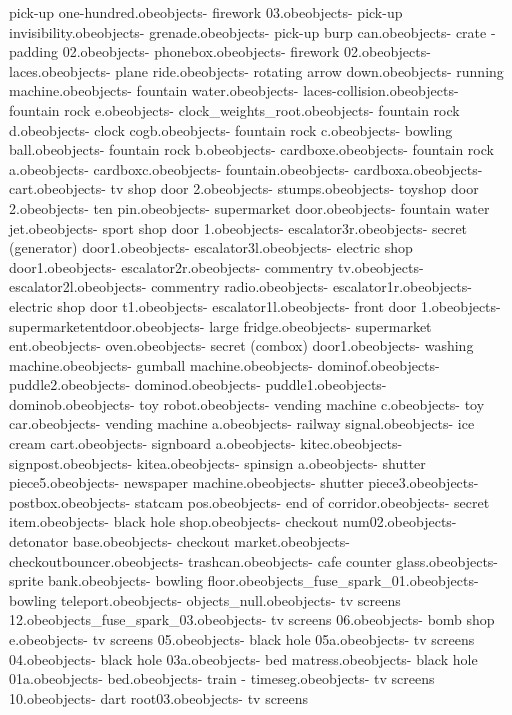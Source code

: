 pick-up one-hundred.obe objects\bank - firework 03.obe objects\bank - pick-up invisibility.obe objects\bank - grenade.obe objects\bank - pick-up burp can.obe objects\bank - crate - padding 02.obe objects\bank - phonebox.obe objects\bank - firework 02.obe objects\bank - laces.obe objects\bank - plane ride.obe objects\bank - rotating arrow down.obe objects\bank - running machine.obe objects\bank - fountain water.obe objects\bank - laces-collision.obe objects\bank - fountain rock e.obe objects\bank - clock_weights_root.obe objects\bank - fountain rock d.obe objects\bank - clock cogb.obe objects\bank - fountain rock c.obe objects\bank - bowling ball.obe objects\bank - fountain rock b.obe objects\bank - cardboxe.obe objects\bank - fountain rock a.obe objects\bank - cardboxc.obe objects\bank - fountain.obe objects\bank - cardboxa.obe objects\bank - cart.obe objects\bank - tv shop door 2.obe objects\bank - stumps.obe objects\bank - toyshop door 2.obe objects\bank - ten pin.obe objects\bank - supermarket door.obe objects\bank - fountain water jet.obe objects\bank - sport shop door 1.obe objects\bank - escalator3r.obe objects\bank - secret (generator) door1.obe objects\bank - escalator3l.obe objects\bank - electric shop door1.obe objects\bank - escalator2r.obe objects\bank - commentry tv.obe objects\bank - escalator2l.obe objects\bank - commentry radio.obe objects\bank - escalator1r.obe objects\bank - electric shop door t1.obe objects\bank - escalator1l.obe objects\bank - front door 1.obe objects\bank - supermarketentdoor.obe objects\bank - large fridge.obe objects\bank - supermarket ent.obe objects\bank - oven.obe objects\bank - secret (combox) door1.obe objects\bank - washing machine.obe objects\bank - gumball machine.obe objects\bank - dominof.obe objects\bank - puddle2.obe objects\bank - dominod.obe objects\bank - puddle1.obe objects\bank - dominob.obe objects\bank - toy robot.obe objects\bank - vending machine c.obe objects\bank - toy car.obe objects\bank - vending machine a.obe objects\bank - railway signal.obe objects\bank - ice cream cart.obe objects\bank - signboard a.obe objects\bank - kitec.obe objects\bank - signpost.obe objects\bank - kitea.obe objects\bank - spinsign a.obe objects\bank - shutter piece5.obe objects\bank - newspaper machine.obe objects\bank - shutter piece3.obe objects\bank - postbox.obe objects\bank - statcam pos.obe objects\bank - end of corridor.obe objects\bank - secret item.obe objects\bank - black hole shop.obe objects\bank - checkout num02.obe objects\bank - detonator base.obe objects\bank - checkout market.obe objects\bank - checkoutbouncer.obe objects\bank - trashcan.obe objects\bank - cafe counter glass.obe objects\bank - sprite bank.obe objects\bank - bowling floor.obe objects\bank_fuse_spark_01.obe objects\bank - bowling teleport.obe objects\bank - objects_null.obe objects\bank - tv screens 12.obe objects\bank_fuse_spark_03.obe objects\bank - tv screens 06.obe objects\bank - bomb shop e.obe objects\bank - tv screens 05.obe objects\bank - black hole 05a.obe objects\bank - tv screens 04.obe objects\bank - black hole 03a.obe objects\bank - bed matress.obe objects\bank - black hole 01a.obe objects\bank - bed.obe objects\bank - train - timeseg.obe objects\bank - tv screens 10.obe objects\bank - dart root03.obe objects\bank - tv screens 